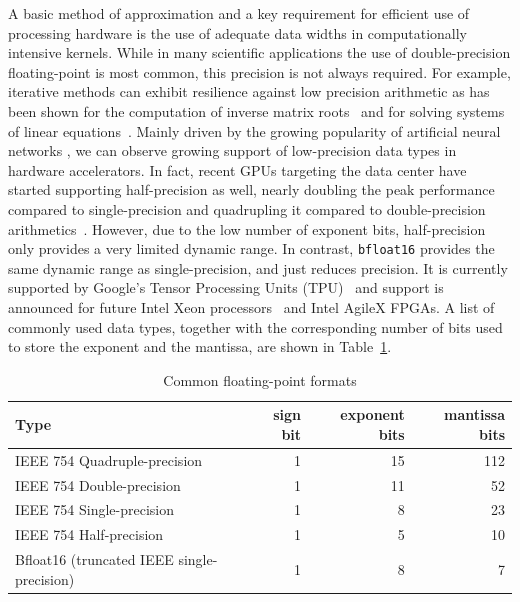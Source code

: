 \documentclass[format=acmsmall,urlbreakonhyphens]{acmart}
\begin{document}
A basic method of approximation and a key requirement for efficient use of processing hardware is the use of adequate data widths in computationally intensive kernels. While in many scientific applications the use of double-precision floating-point is most common, this precision is not always required.
For example, iterative methods can exhibit resilience against low precision arithmetic as has been shown for the computation of inverse matrix roots~\cite{lass17-esl} and for solving systems of linear equations~\cite{KlavikMalossiBekasEtAl2014,Bekas,Dongarra2017,Dongarra2018}.
Mainly driven by the growing popularity of artificial neural networks \cite{Gupta2015}, we can observe growing support of low-precision data types %
in hardware accelerators.
%
In fact, recent GPUs targeting the data center have started supporting half-precision as well, nearly doubling the peak performance compared to single-precision and quadrupling it compared to double-precision arithmetics~\cite{tesla}. However, due to the low number of exponent bits, half-precision only provides a very limited dynamic range. In contrast, \texttt{bfloat16} provides the same dynamic range as single-precision, and just reduces precision. It is currently supported by Google's Tensor Processing Units (TPU)~\cite{tpu} and support is announced for future Intel Xeon processors~\cite{xeon} and Intel AgileX FPGAs. A list of commonly used data types, together with the corresponding number of bits used to store the exponent and the mantissa, are shown in Table~\ref{tab:float}.
\begin{table}
  \caption{Common floating-point formats}
  \label{tab:float}
  \begin{tabular}{lrrr}
    Type & sign bit & exponent bits & mantissa bits \\
    \hline
    IEEE 754 Quadruple-precision & 1 & 15 & 112 \\
    IEEE 754 Double-precision & 1 & 11 & 52 \\
    IEEE 754 Single-precision & 1 & 8 & 23 \\
    IEEE 754 Half-precision & 1 & 5 & 10 \\
    Bfloat16 (truncated IEEE single-precision) & 1 & 8 & 7
  \end{tabular}
\end{table}
\end{document}
